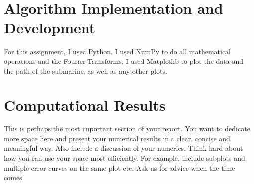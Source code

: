\documentclass[11pt]{amsart}
\begin{document}

\section{Algorithm Implementation and Development}\label{sec:algorithms}

For this assignment, I used Python. I used NumPy to do all mathematical operations and the Fourier Transforms. 
I used Matplotlib to plot the data and the path of the submarine, as well as any other plots. 



\section{Computational Results}\label{sec:results}

This is perhaps the most important section of your report. You want to dedicate more space 
here and present your numerical results in a clear, concise and meaningful way. Also 
include a discussion of your numerics. Think hard about how you can use 
your space most efficiently. For example, include subplots and multiple error curves on the 
same plot etc. Ask us for advice when the time comes. 
\end{document}
